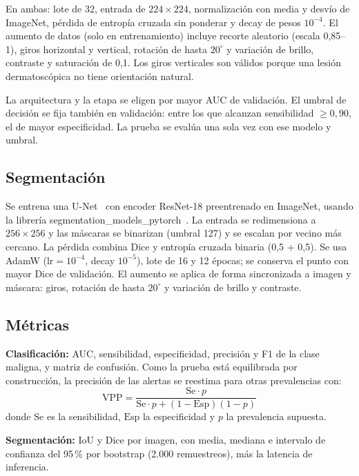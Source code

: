 \documentclass[conference]{IEEEtran}
\begin{document}
	En ambas: lote de 32, entrada de $224\times224$, normalización con media y desvío de ImageNet, pérdida de entropía cruzada sin ponderar y decay de pesos $10^{-4}$. El aumento de datos (solo en entrenamiento) incluye recorte aleatorio (escala 0,85--1), giros horizontal y vertical, rotación de hasta $20^{\circ}$ y variación de brillo, contraste y saturación de 0,1. Los giros verticales son válidos porque una lesión dermatoscópica no tiene orientación natural.
	
	La arquitectura y la etapa se eligen por mayor AUC de validación. El umbral de decisión se fija también en validación: entre los que alcanzan sensibilidad $\geq 0{,}90$, el de mayor especificidad. La prueba se evalúa una sola vez con ese modelo y umbral.
	
	\subsection{Segmentación}
	
	Se entrena una U-Net~\cite{ronneberger2015} con encoder ResNet-18 preentrenado en ImageNet, usando la librería segmentation\_models\_pytorch~\cite{iakubovskii2019}. La entrada se redimensiona a $256\times256$ y las máscaras se binarizan (umbral 127) y se escalan por vecino más cercano. La pérdida combina Dice y entropía cruzada binaria (0,5 + 0,5). Se usa AdamW ($\mathrm{lr} = 10^{-4}$, decay $10^{-5}$), lote de 16 y 12 épocas; se conserva el punto con mayor Dice de validación. El aumento se aplica de forma sincronizada a imagen y máscara: giros, rotación de hasta $20^{\circ}$ y variación de brillo y contraste.
	
	\subsection{Métricas}
	
	\textbf{Clasificación:} AUC, sensibilidad, especificidad, precisión y F1 de la clase maligna, y matriz de confusión. Como la prueba está equilibrada por construcción, la precisión de las alertas se reestima para otras prevalencias con:
	\begin{equation}
		\mathrm{VPP} = \frac{\mathrm{Se}\cdot p}{\mathrm{Se}\cdot p + (1-\mathrm{Esp})(1-p)}
		\label{eq:vpp}
	\end{equation}
	donde $\mathrm{Se}$ es la sensibilidad, $\mathrm{Esp}$ la especificidad y $p$ la prevalencia supuesta.
	
	\textbf{Segmentación:} IoU y Dice por imagen, con media, mediana e intervalo de confianza del 95\,\% por bootstrap (2.000 remuestreos), más la latencia de inferencia.
	
\end{document}
